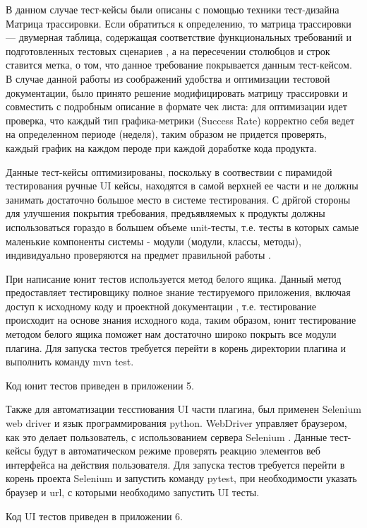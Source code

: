 В данном случае тест-кейсы были описаны с помощью техники тест-дизайна Матрица трассировки. Если обратиться к определению, то матрица трассировки — двумерная таблица, содержащая соответствие функциональных требований и подготовленных тестовых сценариев \cite{matrixtest}, а на пересечении столюбцов и строк ставится метка, о том, что данное требование покрывается данным тест-кейсом. В случае данной работы из соображений удобства и оптимизации тестовой документации, было принято решение модифицировать матрицу трассировки и совместить с подробным описание в формате чек листа: для оптимизации идет проверка, что каждый тип графика-метрики (Success Rate) корректно себя ведет на определенном периоде (неделя), таким образом не придется проверять, каждый график на каждом пероде при каждой доработке кода продукта.

Данные тест-кейсы оптимизированы, поскольку в соотвествии с пирамидой тестирования \cite{TestPyramid} ручные UI кейсы, находятся в самой верхней ее части и не должны занимать достаточно большое место в системе тестирования. С дрйгой стороны для улучшения покрытия требования, предъявляемых к продукты должны использоваться гораздо в большем объеме unit-тесты, т.е. тесты в которых самые маленькие компоненты системы - модули (модули, классы, методы), индивидуально проверяются на предмет правильной работы \cite{unittest}.

При написание юнит тестов используется метод белого ящика. Данный метод предоставляет тестировщику полное знание тестируемого приложения, включая доступ к исходному коду и проектной документации \cite {whitebox}, т.е. тестирование происходит на основе знания исходного кода, таким образом, юнит тестирование методом белого ящика поможет нам достаточно широко покрыть все модули плагина. Для запуска тестов требуется перейти в корень директории плагина и выполнить команду mvn test.

Код юнит тестов приведен в приложении 5.

Также для автоматизации тесстиования UI части плагина, был применен Selenium web driver и язык программирования python. WebDriver управляет браузером, как это делает пользователь, с использованием сервера Selenium \cite{webdriver}. Данные тест-кейсы будут в автоматическом режиме проверять реакцию элементов веб интерфейса на действия пользователя. Для запуска тестов требуется перейти в корень проекта Selenium и запустить команду pytest, при необходимости указать браузер и url, с которыми необходимо запустить UI тесты.

Код UI тестов приведен в приложении 6.



